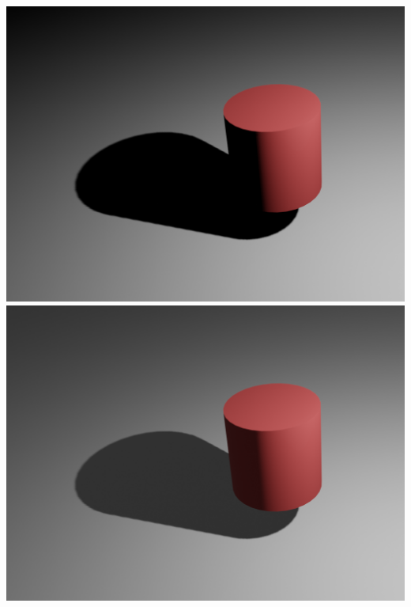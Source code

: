 \documentclass[11pt,class=report,crop=false]{standalone}
\begin{document}
\begin{center}
	\includegraphics[scale=\myscale,scale=0.2,trim={2cm 2cm 2cm 2cm},clip]{figures/ombre-brute}
	\qquad
	\includegraphics[scale=\myscale,scale=0.2,trim={2cm 2cm 2cm 2cm},clip]{figures/ombre-ambiante}
\end{center}	
\end{document}
